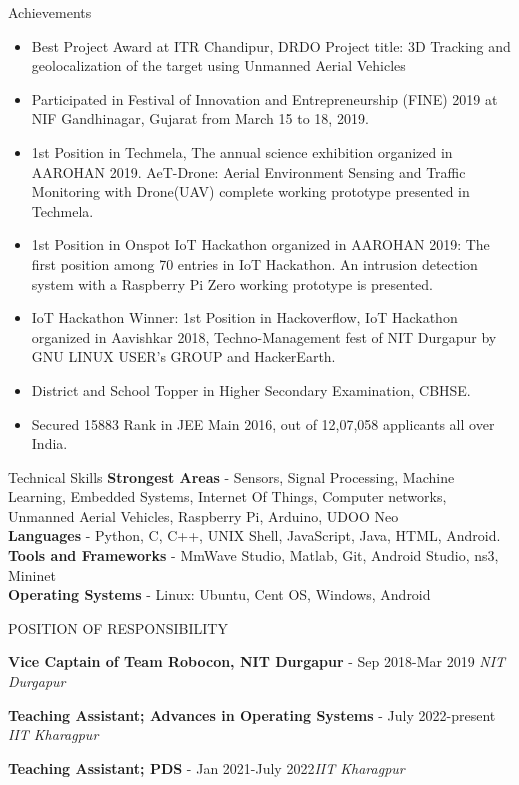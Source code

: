 \documentclass{resume} %
\begin{document}
	\begin{rSection}{Achievements} 
		\begin{itemize}
			\item Best Project Award at ITR Chandipur, DRDO Project title: 3D Tracking and geolocalization of the target using Unmanned Aerial Vehicles
			\item Participated in Festival of Innovation and Entrepreneurship (FINE) 2019 at NIF Gandhinagar, Gujarat from March 15 to 18, 2019.
			\item 1st Position in Techmela, The annual science exhibition organized in AAROHAN 2019. AeT-Drone: Aerial Environment Sensing and Traffic Monitoring with Drone(UAV) complete working prototype presented in Techmela.
			\item 1st Position in Onspot IoT Hackathon organized in AAROHAN 2019: The first position among 70 entries in IoT Hackathon. An intrusion detection system with a Raspberry Pi Zero working prototype is presented.
			\item IoT Hackathon Winner: 1st Position in Hackoverflow, IoT Hackathon organized in Aavishkar 2018, Techno-Management fest of NIT Durgapur by GNU LINUX USER's GROUP and HackerEarth.
			\item District and School Topper in Higher Secondary Examination, CBHSE.
			\item Secured 15883 Rank in JEE Main 2016, out of 12,07,058
			applicants all over India.
		\end{itemize}
	\end{rSection}
	\newpage
	\begin{rSection}{Technical Skills}
		\textbf{Strongest Areas} - Sensors, Signal Processing, Machine Learning, Embedded Systems, Internet Of Things, Computer networks, Unmanned Aerial Vehicles, Raspberry Pi, Arduino, UDOO Neo
		\\
		\textbf{Languages} - Python, C, C++, UNIX Shell, JavaScript, Java, HTML, Android.\\
		
		\textbf{Tools and Frameworks} - MmWave Studio, Matlab, Git, Android Studio, ns3, Mininet\\
		\textbf{Operating Systems} - Linux: Ubuntu, Cent OS, Windows, Android\\
	\end{rSection}
	
	\begin{rSection}{POSITION OF RESPONSIBILITY}
		
		{\bf Vice Captain of Team Robocon, NIT Durgapur} - Sep 2018-Mar 2019 \hfill {\em NIT Durgapur} 
		
		{\bf Teaching Assistant; Advances in Operating Systems} - July 2022-present \hfill {\em IIT Kharagpur}
		
		{\bf Teaching Assistant; PDS} - Jan 2021-July 2022\hfill {\em IIT Kharagpur} 
		
		
		
	\end{rSection}
	
\end{document}
